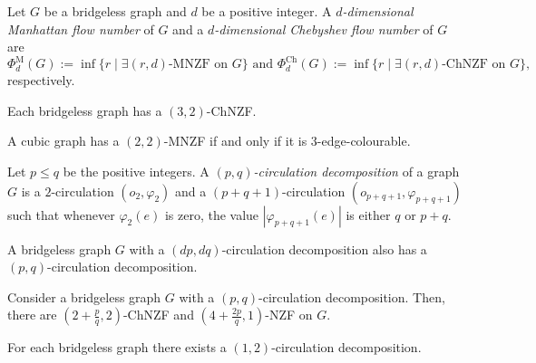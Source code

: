 \begin{definition}
	Let $G$ be a bridgeless graph and $d$ be a positive integer. A \emph{$d$-dimensional Manhattan flow number} of $G$ and a \emph{$d$-dimensional Chebyshev flow number} of $G$ are
	\begin{equation*}
		\Phi_d^\text{M}(G) := \inf\{r\mid\exists(r, d)\text{-MNZF on }G\}\text{ and } \Phi_d^\text{Ch}(G) := \inf\{r\mid\exists(r, d)\text{-ChNZF on }G\},
	\end{equation*}
 respectively.
\end{definition}

\begin{proposition}
    Each bridgeless graph has a $(3, 2)$-ChNZF.\label{prop:manhattan_upper_seymour}
\end{proposition}

\begin{theorem}
    A cubic graph has a $(2, 2)$-MNZF if and only if it is $3$-edge-colourable.\label{th:2_mnzf_iff_3_col}
\end{theorem}

\begin{definition}
        Let $p\leq q$ be the positive integers. A \emph{$(p,q)$-circulation decomposition} of a graph $G$ is a $2$-circulation $(o_2,\varphi_2)$ and a $(p+q+1)$-circulation $(o_{p+q+1}, \varphi_{p+q+1})$ such that whenever $\varphi_2(e)$ is zero, the value $|\varphi_{p+q+1}(e)|$ is either $q$ or $p+q$.
\end{definition}

\begin{lemma}
A bridgeless graph $G$ with a $(dp,dq)$-circulation decomposition also has a $(p,q)$-circulation decomposition.\label{lem:circ_rel_prime}
\end{lemma}

\begin{proposition}
    Consider a bridgeless graph $G$ with a $(p,q)$-circulation decomposition. Then, there are $\left(2+\frac pq,2\right)$-ChNZF and $\left(4+\frac {2p}q, 1\right)$-NZF on $G$.\label{prop:nzf_from_two_circulations_generalised}
\end{proposition}

\begin{conjecture}
    For each bridgeless graph there exists a $(1, 2)$-circulation decomposition.
\end{conjecture}

